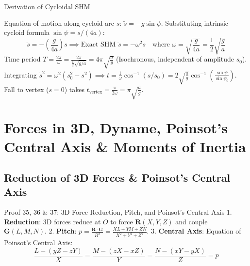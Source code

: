 \documentclass[11pt, a4paper]{report}
\begin{document}
\begin{proofbox}{Derivation of Cycloidal SHM}
\begin{center}
\end{center}

Equation of motion along cycloid arc $s$: $\ddot{s} = -g\sin\psi$. Substituting intrinsic cycloid formula $\sin\psi = s/(4a)$:
\[
\ddot{s} = -\left(\frac{g}{4a}\right) s \implies \text{Exact SHM } \ddot{s} = -\omega^2 s \quad \text{where } \omega = \sqrt{\frac{g}{4a}} = \frac{1}{2}\sqrt{\frac{g}{a}}
\]
Time period $T = \frac{2\pi}{\omega} = \frac{2\pi}{\frac{1}{2}\sqrt{g/a}} = 4\pi\sqrt{\frac{a}{g}}$ (Isochronous, independent of amplitude $s_0$).\\
Integrating $\dot{s}^2 = \omega^2(s_0^2 - s^2) \implies t = \frac{1}{\omega}\cos^{-1}(s/s_0) = 2\sqrt{\frac{a}{g}}\cos^{-1}\left(\frac{\sin\psi}{\sin\psi_0}\right)$. Fall to vertex ($s=0$) takes $t_{\text{vertex}} = \frac{\pi}{2\omega} = \pi\sqrt{\frac{a}{g}}$.
\end{proofbox}

\chapter{Forces in 3D, Dyname, Poinsot's Central Axis \& Moments of Inertia}

\section{Reduction of 3D Forces \& Poinsot's Central Axis}

\begin{theorembox}{Proof 35, 36 \& 37: 3D Force Reduction, Pitch, and Poinsot's Central Axis}
1. \textbf{Reduction}: 3D forces reduce at $O$ to force $\mathbf{R}(X,Y,Z)$ and couple $\mathbf{G}(L,M,N)$.
2. \textbf{Pitch}: $p = \frac{\mathbf{R} \cdot \mathbf{G}}{R^2} = \frac{XL + YM + ZN}{X^2 + Y^2 + Z^2}$.
3. \textbf{Central Axis}: Equation of Poinsot's Central Axis:
\begin{equation}
\frac{L - (yZ - zY)}{X} = \frac{M - (zX - xZ)}{Y} = \frac{N - (xY - yX)}{Z} = p
\end{equation}
\end{theorembox}
\end{document}
